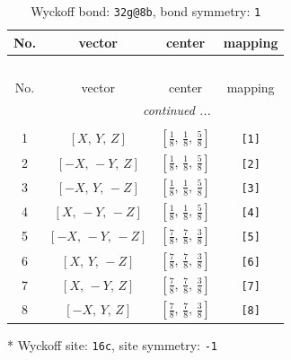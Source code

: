\documentclass[fleqn,8pt]{jsarticle}
\begin{document}
\renewcommand{\arraystretch}{1.2}
\begin{longtable}{cccc}
\caption{Wyckoff bond: {\tt 32g@8b}, bond symmetry: {\tt 1}}
 \\
 \hline \hline
No. & vector & center & mapping \\ \hline \endfirsthead

\multicolumn{3}{l}{\tablename\ \thetable{}} \\
 \hline \hline
No. & vector & center & mapping \\ \hline \endhead

 \hline \hline
\multicolumn{3}{r}{\footnotesize\it continued ...} \\ \endfoot

 \hline \hline
\multicolumn{3}{r}{} \\ \endlastfoot

1 & $\left[ X,\, Y,\, Z \right]$ & $\left[ \frac{1}{8},\, \frac{1}{8},\, \frac{5}{8} \right]$ & {\tt [1]} \\ \hline
2 & $\left[ - X,\, - Y,\, Z \right]$ & $\left[ \frac{1}{8},\, \frac{1}{8},\, \frac{5}{8} \right]$ & {\tt [2]} \\ \hline
3 & $\left[ - X,\, Y,\, - Z \right]$ & $\left[ \frac{1}{8},\, \frac{1}{8},\, \frac{5}{8} \right]$ & {\tt [3]} \\ \hline
4 & $\left[ X,\, - Y,\, - Z \right]$ & $\left[ \frac{1}{8},\, \frac{1}{8},\, \frac{5}{8} \right]$ & {\tt [4]} \\ \hline
5 & $\left[ - X,\, - Y,\, - Z \right]$ & $\left[ \frac{7}{8},\, \frac{7}{8},\, \frac{3}{8} \right]$ & {\tt [5]} \\ \hline
6 & $\left[ X,\, Y,\, - Z \right]$ & $\left[ \frac{7}{8},\, \frac{7}{8},\, \frac{3}{8} \right]$ & {\tt [6]} \\ \hline
7 & $\left[ X,\, - Y,\, Z \right]$ & $\left[ \frac{7}{8},\, \frac{7}{8},\, \frac{3}{8} \right]$ & {\tt [7]} \\ \hline
8 & $\left[ - X,\, Y,\, Z \right]$ & $\left[ \frac{7}{8},\, \frac{7}{8},\, \frac{3}{8} \right]$ & {\tt [8]} \\
\end{longtable}
* Wyckoff site: {\tt 16c}, site symmetry: {\tt -1}
\renewcommand{\arraystretch}{1.2}
\end{document}
